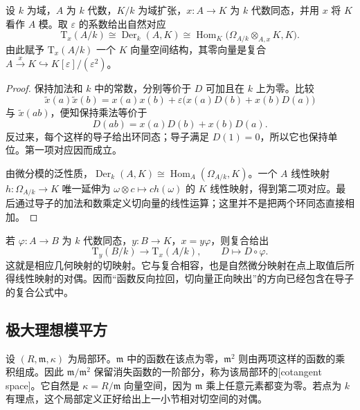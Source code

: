 \begin{proposition}\label{g5:prop:tangent-derivations}
	设 \(k\) 为域，\(A\) 为 \(k\) 代数，\(K/k\) 为域扩张，\(x:A\to K\) 为 \(k\) 代数同态，并用 \(x\) 将 \(K\) 看作 \(A\) 模。取 \(\varepsilon\) 的系数给出自然对应
	\[
		\mathrm{T}_x(A/k)\cong\operatorname{Der}_k(A,K)
		\cong\operatorname{Hom}_K
		\bigl(\Omega_{A/k}\otimes_{A,x}K,K\bigr).
	\]
	由此赋予 \(\mathrm{T}_x(A/k)\) 一个 \(K\) 向量空间结构，其零向量是复合 \(A\xrightarrow{x}K\hookrightarrow K[\varepsilon]/(\varepsilon^2)\)。
\end{proposition}
\begin{proof}
	保持加法和 \(k\) 中的常数，分别等价于 \(D\) 可加且在 \(k\) 上为零。比较
	\[
		\widetilde x(a)\widetilde x(b)
		=x(a)x(b)+\varepsilon\bigl(x(a)D(b)+x(b)D(a)\bigr)
	\]
	与 \(\widetilde x(ab)\)，便知保持乘法等价于
	\[
		D(ab)=x(a)D(b)+x(b)D(a).
	\]
	反过来，每个这样的导子给出环同态；导子满足 \(D(1)=0\)，所以它也保持单位。第一项对应因而成立。

	由微分模的泛性质，\(\operatorname{Der}_k(A,K)\cong\operatorname{Hom}_A(\Omega_{A/k},K)\)。一个 \(A\) 线性映射 \(h:\Omega_{A/k}\to K\) 唯一延伸为 \(\omega\otimes c\mapsto c h(\omega)\) 的 \(K\) 线性映射，得到第二项对应。最后通过导子的加法和数乘定义切向量的线性运算；这里并不是把两个环同态直接相加。
\end{proof}

若 \(\varphi:A\to B\) 为 \(k\) 代数同态，\(y:B\to K\)，\(x=y\varphi\)，则复合给出
\[
	\mathrm{T}_y(B/k)\longrightarrow \mathrm{T}_x(A/k),\qquad
	D\longmapsto D\circ\varphi.
\]
这就是相应几何映射的切映射。它与复合相容，也是自然微分映射在点上取值后所得线性映射的对偶。因而“函数反向拉回，切向量正向映出”的方向已经包含在导子的复合公式中。

\subsection{极大理想模平方}
\label{g5:subsec:0503:02}

设 \((R,\mathfrak m,\kappa)\) 为局部环。\(\mathfrak m\) 中的函数在该点为零，\(\mathfrak m^2\) 则由两项这样的函数的乘积组成。因此 \(\mathfrak m/\mathfrak m^2\) 保留消失函数的一阶部分，称为该局部环的[cotangent space]。它自然是 \(\kappa=R/\mathfrak m\) 向量空间，因为 \(\mathfrak m\) 乘上任意元素都变为零。若点为 \(k\) 有理点，这个局部定义正好给出上一小节相对切空间的对偶。


